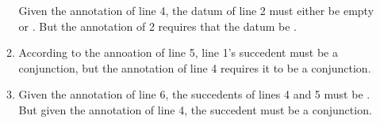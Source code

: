 \begin{enumerate}
\begin{enumerate}
\begin{argumentN}[1]




\end{argumentN}

\opts{

 \dotline
 \dotline

}
{Given the annotation of line 4, the datum of line 2 must either be empty or 
\p{\Delta}. But the annotation of 2 requires that the datum be \p{\Gamma}.}

\newpage

\item 
\begin{argumentN}[1]






\end{argumentN}

\opts{

 \dotline
 \dotline

}
{According to the annoation of line 5, line 1's succedent must be a conjunction, 
but the annotation of line 4 requires it to be a conjunction.}

\item
\begin{argumentN}[1]








\end{argumentN}

\opts{

 \dotline
 \dotline

}
{Given the annotation of line 6, the succedents of lines 4 and 5 must be 
 . But given the annotation of line 4, the succedent must be a 
 conjunction.
}


\end{enumerate}
\end{enumerate}
